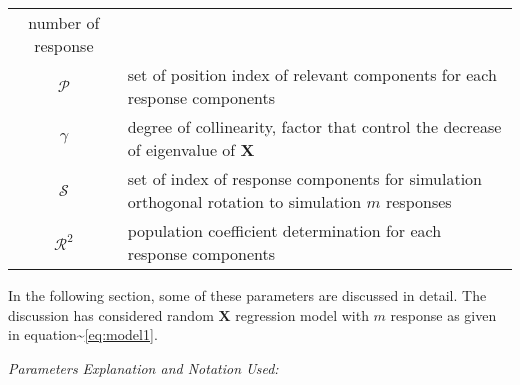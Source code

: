 \documentclass[12pt,a4paperpaper,authoryear]{elsarticle} %
\begin{document}
\begin{longtable}[]{@{}cl@{}}
\begin{minipage}[t]{0.80\columnwidth}
number of response\strut
\end{minipage}\tabularnewline
\begin{minipage}[t]{0.14\columnwidth}\centering\strut
\(\mathcal{P}\)\strut
\end{minipage} & \begin{minipage}[t]{0.80\columnwidth}\raggedright\strut
set of position index of relevant components for each response
components\strut
\end{minipage}\tabularnewline
\begin{minipage}[t]{0.14\columnwidth}\centering\strut
\(\gamma\)\strut
\end{minipage} & \begin{minipage}[t]{0.80\columnwidth}\raggedright\strut
degree of collinearity, factor that control the decrease of eigenvalue
of \(\mathbf{X}\)\strut
\end{minipage}\tabularnewline
\begin{minipage}[t]{0.14\columnwidth}\centering\strut
\(\mathcal{S}\)\strut
\end{minipage} & \begin{minipage}[t]{0.80\columnwidth}\raggedright\strut
set of index of response components for simulation orthogonal rotation
to simulation \(m\) responses\strut
\end{minipage}\tabularnewline
\begin{minipage}[t]{0.14\columnwidth}\centering\strut
\(\mathcal{R}^2\)\strut
\end{minipage} & \begin{minipage}[t]{0.80\columnwidth}\raggedright\strut
population coefficient determination for each response components\strut
\end{minipage}\tabularnewline
\bottomrule
\end{longtable}

In the following section, some of these parameters are discussed in
detail. The discussion has considered random \(\mathbf{X}\) regression
model with \(m\) response as given in
equation\textasciitilde{}\eqref{eq:model1}.

\emph{Parameters Explanation and Notation Used:}
\end{document}
